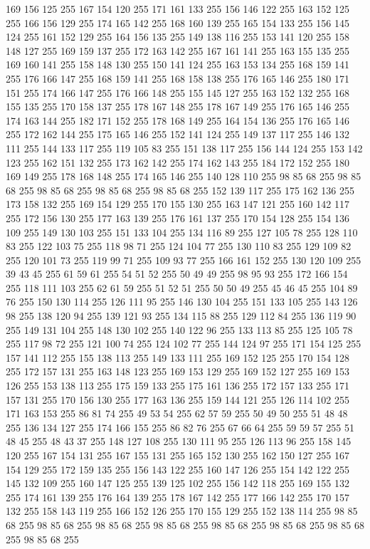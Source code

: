 169 156 125 255 167 154 120 255 171 161 133 255 156 146 122 255 163 152 125 255 166 156 129 255 174 165 142 255 168 160 139 255 165 154 133 255 156 145 124 255 161 152 129 255 164 156 135 255 149 138 116 255 153 141 120 255 158 148 127 255 169 159 137 255 172 163 142 255 167 161 141 255 163 155 135 255 169 160 141 255 158 148 130 255 150 141 124 255 163 153 134 255 168 159 141 255 176 166 147 255 168 159 141 255 168 158 138 255 176 165 146 255 180 171 151 255 174 166 147 255 176 166 148 255 155 145 127 255 163 152 132 255 168 155 135 255 170 158 137 255 178 167 148 255 178 167 149 255 176 165 146 255 174 163 144 255 182 171 152 255 178 168 149 255 164 154 136 255 176 165 146 255 172 162 144 255 175 165 146 255 152 141 124 255 149 137 117 255 146 132 111 255 144 133 117 255 119 105 83 255 151 138 117 255 156 144 124 255 153 142 123 255 162 151 132 255 173 162 142 255 174 162 143 255 184 172 152 255 180 169 149 255 178 168 148 255 174 165 146 255 140 128 110 255 98 85 68 255 98 85 68 255 98 85 68 255
98 85 68 255 98 85 68 255 152 139 117 255 175 162 136 255 173 158 132 255 169 154 129 255 170 155 130 255 163 147 121 255 160 142 117 255 172 156 130 255 177 163 139 255 176 161 137 255 170 154 128 255 154 136 109 255 149 130 103 255 151 133 104 255 134 116 89 255 127 105 78 255 128 110 83 255 122 103 75 255 118 98 71 255 124 104 77 255 130 110 83 255 129 109 82 255 120 101 73 255 119 99 71 255 109 93 77 255 166 161 152 255 130 120 109 255 39 43 45 255 61 59 61 255 54 51 52 255 50 49 49 255 98 95 93 255 172 166 154 255 118 111 103 255 62 61 59 255 51 52 51 255 50 50 49 255 45 46 45 255 104 89 76 255 150 130 114 255 126 111 95 255 146 130 104 255 151 133 105 255 143 126 98 255 138 120 94 255 139 121 93 255 134 115 88 255 129 112 84 255 136 119 90 255 149 131 104 255 148 130 102 255 140 122 96 255 133 113 85 255 125 105 78 255 117 98 72 255 121 100 74 255 124 102 77 255 144 124 97 255 171 154 125 255 157 141 112 255 155 138 113 255 149 133 111 255
169 152 125 255 170 154 128 255 172 157 131 255 163 148 123 255 169 153 129 255 169 152 127 255 169 153 126 255 153 138 113 255 175 159 133 255 175 161 136 255 172 157 133 255 171 157 131 255 170 156 130 255 177 163 136 255 159 144 121 255 126 114 102 255 171 163 153 255 86 81 74 255 49 53 54 255 62 57 59 255 50 49 50 255 51 48 48 255 136 134 127 255 174 166 155 255 86 82 76 255 67 66 64 255 59 59 57 255 51 48 45 255 48 43 37 255 148 127 108 255 130 111 95 255 126 113 96 255 158 145 120 255 167 154 131 255 167 155 131 255 165 152 130 255 162 150 127 255 167 154 129 255 172 159 135 255 156 143 122 255 160 147 126 255 154 142 122 255 145 132 109 255 160 147 125 255 139 125 102 255 156 142 118 255 169 155 132 255 174 161 139 255 176 164 139 255 178 167 142 255 177 166 142 255 170 157 132 255 158 143 119 255 166 152 126 255 170 155 129 255 152 138 114 255 98 85 68 255 98 85 68 255 98 85 68 255 98 85 68 255 98 85 68 255 98 85 68 255 98 85 68 255 98 85 68 255

